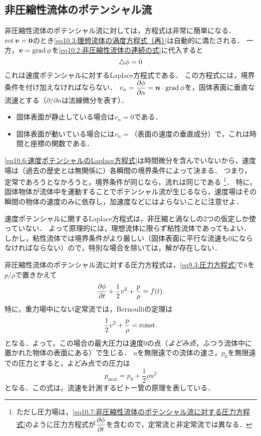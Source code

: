 \subsection*{非圧縮性流体のポテンシャル流}
非圧縮性流体のポテンシャル流に対しては，方程式は非常に簡単になる．
$\operatorname{rot}\vb*{v}=\vb*{0}$のとき\eqref{eq10.3:理想流体の渦度方程式（再）}は自動的に満たされる．
一方，$\vb*{v} = \operatorname{grad}\phi$を\eqref{eq10.2:非圧縮性流体の連続の式}に代入すると
\begin{equation}\label{eq10.6:速度ポテンシャルのLaplace方程式}
    \triangle\phi = 0
\end{equation}
これは速度ポテンシャルに対するLaplace方程式である．
この方程式には，境界条件を付け加えなければならない．
$v_n = \dpdv{\phi}{n} = \vec{n} \cdot \Grad \phi$を，固体表面に垂直な流速とする（$\partial/\partial n$は法線微分を表す）．
\begin{itemize}
    \item 固体表面が静止している場合は$v_n=0$である．
    \item 固体表面が動いている場合には$v_n = \text{（表面の速度の垂直成分）}$で，これは時間と座標の関数である．
\end{itemize}
\eqref{eq10.6:速度ポテンシャルのLaplace方程式}は時間微分を含んでいないから，速度場は（過去の歴史とは無関係に）各瞬間の境界条件によって決まる．
つまり，定常であろうとなかろうと，境界条件が同じなら，流れは同じである
\footnote{ただし圧力場は，\eqref{eq10.7:非圧縮性流体のポテンシャル流に対する圧力方程式}のように圧力方程式が$\dpdv{\phi}{t}$を含むので，定常流と非定常流では異なる．}．
特に，固体物体が流体中を運動することでポテンシャル流が生じるなら，速度場はその瞬間の物体の速度のみに依存し，加速度などにはよらないことに注意せよ．


\begin{details}
速度ポテンシャルに関するLaplace方程式は，非圧縮と渦なしの2つの仮定しか使っていない．
よって原理的には，理想流体に限らず粘性流体であってもよい．
しかし，粘性流体では境界条件がより厳しい（固体表面に平行な流速も0にならなければならない）ので，特別な場合を除いては，解が存在しない．
\end{details}



非圧縮性流体のポテンシャル流に対する圧力方程式は，\eqref{eq9.3:圧力方程式}で$h$を$p/\rho$で置きかえて
\begin{equation}\label{eq10.7:非圧縮性流体のポテンシャル流に対する圧力方程式}
    \pdv{\phi}{t} + \frac{1}{2}v^2 + \frac{p}{\rho} = f(t) .
\end{equation}
特に，重力場中にない定常流では，Bernoulliの定理は
\[
    \frac{1}{2}v^2 + \frac{p}{\rho} = \mathrm{const.}
\]
となる．よって，この場合の最大圧力は速度0の点（\emph{よどみ点}，ふつう流体中に置かれた物体の表面にある）で生じる．
$u$を無限遠での流体の速さ，$p_0$を無限遠での圧力とすると，よどみ点での圧力は
\begin{equation}
    p_\textrm{max} = p_0 + \frac{1}{2}\rho u^2
\end{equation}
となる．この式は，流速を計測するピトー管の原理を表している．




